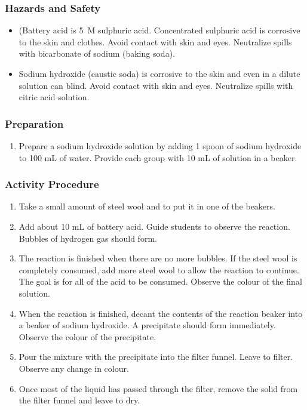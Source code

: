 \subsubsection*{Hazards and Safety}
\begin{itemize}
\item{(Battery acid is 5~M sulphuric acid. Concentrated sulphuric acid is corrosive to the skin and clothes. Avoid contact with skin and eyes. Neutralize spills with bicarbonate of sodium (baking soda).}
\item{Sodium hydroxide (caustic soda) is corrosive to the skin and even in a dilute solution can blind. Avoid contact with skin and eyes. Neutralize spills with citric acid solution.}
\end{itemize}

\subsubsection*{Preparation}
\begin{enumerate}
\item{Prepare a sodium hydroxide solution by adding 1 spoon of sodium hydroxide to 100 mL of water. Provide each group with 10 mL of solution in a beaker.}
\end{enumerate}

\subsubsection*{Activity Procedure}
\begin{enumerate}
\item{Take a small amount of steel wool and to put it in one of the beakers.}
\item{Add about 10 mL of battery acid. Guide students to observe the reaction. Bubbles of hydrogen gas should form.}
\item{The reaction is finished when there are no more bubbles. If the steel wool is completely consumed, add more steel wool to allow the reaction to continue. The goal is for all of the acid to be consumed. Observe the colour of the final solution.}
\item{When the reaction is finished, decant the contents of the reaction beaker into a beaker of sodium hydroxide. A precipitate should form immediately. Observe the colour of the precipitate.}
\item{Pour the mixture with the precipitate into the filter funnel. Leave to filter. Observe any change in colour.}
\item{Once most of the liquid has passed through the filter, remove the solid from the filter funnel and leave to dry.}
\end{enumerate}

